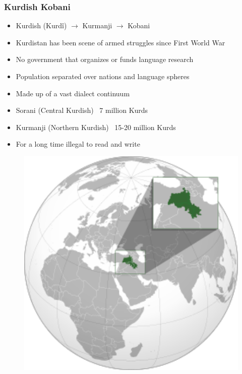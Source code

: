 \documentclass[aspectratio=169]{beamer}
\begin{document}
\begin{frame}[fragile]
	\frametitle{Kurdish Kobani}
    \begin{minipage}{.70\textwidth}
    \centering
    \begin{itemize}
        \item Kurdish (Kurdî) $\rightarrow$ Kurmanji $\rightarrow$ Kobani
        \item Kurdistan has been scene of armed struggles since First World War
        \item No government that organizes or funds language research
        \item Population separated over nations and language spheres
        \item Made up of a vast dialect continuum
        \item Sorani (Central Kurdish) ~7 million Kurds
        \item Kurmanji (Northern Kurdish) ~15-20 million Kurds
        \item For a long time illegal to read and write
    \end{itemize}
    \end{minipage}%
    \begin{minipage}{.30\textwidth}
      \begin{figure}
        \centering
        \includegraphics[width=1.0\textwidth]{images/Kurdistan-Wikipedia-Position.png} 
    \end{figure}
    \end{minipage}


\end{frame}
\end{document}
